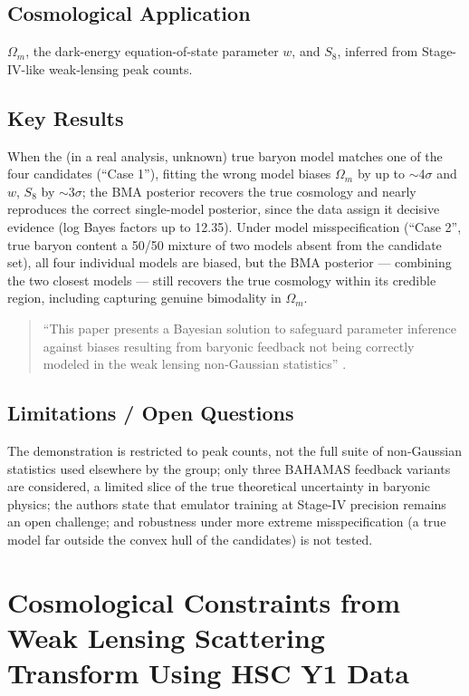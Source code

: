 \documentclass[11pt]{article}
\begin{document}
\subsection{Cosmological Application}
$\Omega_m$, the dark-energy equation-of-state parameter $w$, and $S_8$, inferred from Stage-IV-like weak-lensing peak counts.

\subsection{Key Results}
When the (in a real analysis, unknown) true baryon model matches one of the four candidates (``Case 1''), fitting the wrong model biases $\Omega_m$ by up to $\sim$4$\sigma$ and $w$, $S_8$ by $\sim$3$\sigma$; the BMA posterior recovers the true cosmology and nearly reproduces the correct single-model posterior, since the data assign it decisive evidence (log Bayes factors up to 12.35). Under model misspecification (``Case 2'', true baryon content a 50/50 mixture of two models absent from the candidate set), all four individual models are biased, but the BMA posterior — combining the two closest models — still recovers the true cosmology within its credible region, including capturing genuine bimodality in $\Omega_m$.

\begin{quote}
\enquote{This paper presents a Bayesian solution to safeguard parameter inference against biases resulting from baryonic feedback not being correctly modeled in the weak lensing non-Gaussian statistics} \citep[p.~6]{grandon2024bma}.
\end{quote}

\subsection{Limitations / Open Questions}
The demonstration is restricted to peak counts, not the full suite of non-Gaussian statistics used elsewhere by the group; only three BAHAMAS feedback variants are considered, a limited slice of the true theoretical uncertainty in baryonic physics; the authors state that emulator training at Stage-IV precision remains an open challenge; and robustness under more extreme misspecification (a true model far outside the convex hull of the candidates) is not tested.

\section{Cosmological Constraints from Weak Lensing Scattering Transform Using HSC Y1 Data}
\label{sec:paper4}
\end{document}
